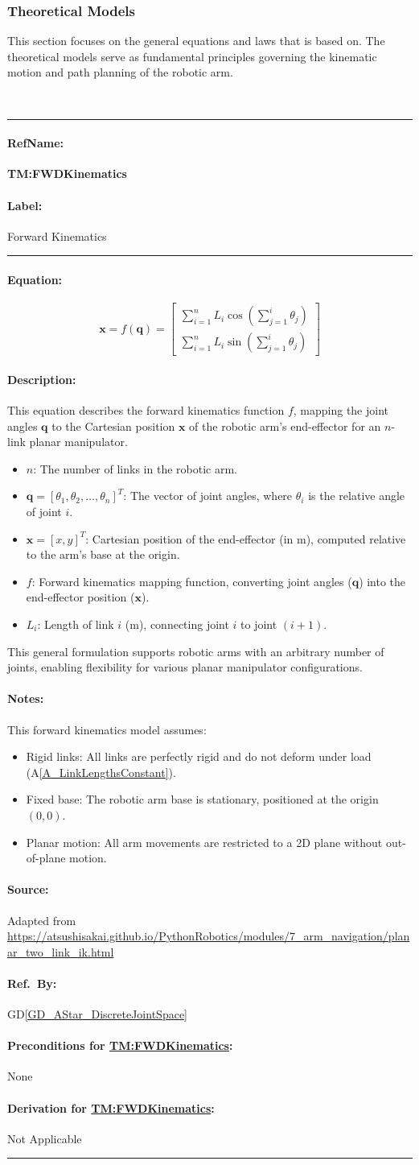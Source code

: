\documentclass[12pt]{article}
\newcommand{\dref}[1]{GD\ref{#1}}
\newcommand{\aref}[1]{A\ref{#1}}
\newcommand{\deftheory}[9][Not Applicable]
{
\newpage
\noindent \rule{\textwidth}{0.5mm}

\paragraph{RefName: } \textbf{#2} \phantomsection 
\label{#2}

\paragraph{Label:} #3

\noindent \rule{\textwidth}{0.5mm}

\paragraph{Equation:}

#4

\paragraph{Description:}

#5

\paragraph{Notes:}

#6

\paragraph{Source:}

#7

\paragraph{Ref.\ By:}

#8

\paragraph{Preconditions for \hyperref[#2]{#2}:}
\label{#2_precond}

#9

\paragraph{Derivation for \hyperref[#2]{#2}:}
\label{#2_deriv}

#1

\noindent \rule{\textwidth}{0.5mm}

}
\begin{document}
\subsubsection{Theoretical Models}\label{sec_theoretical}

This section focuses on the general equations and laws that \progname{} is based
on. The theoretical models serve as fundamental principles governing the kinematic motion and path planning of the robotic arm. 

~\newline
\noindent
\deftheory
{TM:FWDKinematics}
{Forward Kinematics}
{
\[
  \mathbf{x} = f(\mathbf{q}) = 
  \begin{bmatrix}
    \sum_{i=1}^{n} L_i \cos\left(\sum_{j=1}^{i}\theta_j\right) \\[6pt]
    \sum_{i=1}^{n} L_i \sin\left(\sum_{j=1}^{i}\theta_j\right)
  \end{bmatrix}
\]
}
{
This equation describes the forward kinematics function $f$, mapping the joint angles $\mathbf{q}$ to the Cartesian position $\mathbf{x}$ of the robotic arm's end-effector for an $n$-link planar manipulator.

\begin{itemize}
    \item $n$: The number of links in the robotic arm.
    \item $\mathbf{q} = [\theta_1, \theta_2, \dots, \theta_n]^T$: The vector of joint angles, where $\theta_i$ is the relative angle of joint $i$.
    \item $\mathbf{x} = [x, y]^T$: Cartesian position of the end-effector (in \si{\metre}), computed relative to the arm's base at the origin.
    \item $f$: Forward kinematics mapping function, converting joint angles ($\mathbf{q}$) into the end-effector position ($\mathbf{x}$).
    \item $L_i$: Length of link $i$ (\si{\metre}), connecting joint $i$ to joint $(i+1)$.
\end{itemize}

This general formulation supports robotic arms with an arbitrary number of joints, enabling flexibility for various planar manipulator configurations.
}
{
This forward kinematics model assumes:
\begin{itemize}
    \item Rigid links: All links are perfectly rigid and do not deform under load (\aref{A_LinkLengthsConstant}).
    \item Fixed base: The robotic arm base is stationary, positioned at the origin $(0, 0)$.
    \item Planar motion: All arm movements are restricted to a 2D plane without out-of-plane motion.
\end{itemize}

}
{
Adapted from \url{https://atsushisakai.github.io/PythonRobotics/modules/7_arm_navigation/planar_two_link_ik.html}
}
{
\dref{GD_AStar_DiscreteJointSpace}
}
{
None
}
{}
\end{document}
